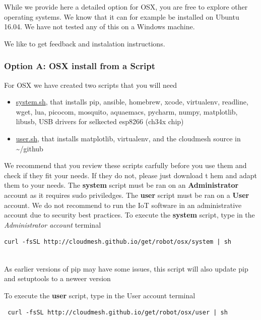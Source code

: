 While we provide here a detailed option for OSX, you are free to explore
other operating systems. We know that it can for example be installed on
Ubuntu 16.04. We have not tested any of this on a Windows machine.

We like to get feedback and instalation instructions.

\subsubsection{Option A: OSX install from a
Script}\label{option-a-osx-install-from-a-script}

For OSX we have created two scripts that you will need

\begin{itemize}
\tightlist
\item
  \href{http://cloudmesh.github.io/get/robot/osx/system/}{system.sh},
  that installs pip, ansible, homebrew, xcode, virtualenv, readline,
  wget, lua, picocom, mosquito, aquaemacs, pycharm, numpy, matplotlib,
  libusb, USB drivers for selkected esp8266 (ch34x chip)
\item
  \href{http://cloudmesh.github.io/get/robot/osx/user}{user.sh}, that
  installs matplotlib, virtualenv, and the cloudmesh source in
  \textasciitilde{}/github
\end{itemize}

We recommend that you review these scripts carfully before you use them
and check if they fit your needs. If they do not, please just download t
hem and adapt them to your needs. The \textbf{system} script must be ran
on an \textbf{Administrator} account as it requires sudo priviledges.
The \textbf{user} script must be ran on a \textbf{User} account. We do
not recommend to run the IoT software in an administrative account due
to security best practices. To execute the \textbf{system} script, type
in the \emph{Administrator account} terminal

\begin{verbatim}
curl -fsSL http://cloudmesh.github.io/get/robot/osx/system | sh
    
\end{verbatim}

As earlier versions of pip may have some issues, this script will also
update pip and setuptools to a neweer version

To execute the \textbf{user} script, type in the User account terminal

\begin{verbatim}
 curl -fsSL http://cloudmesh.github.io/get/robot/osx/user | sh
\end{verbatim}

